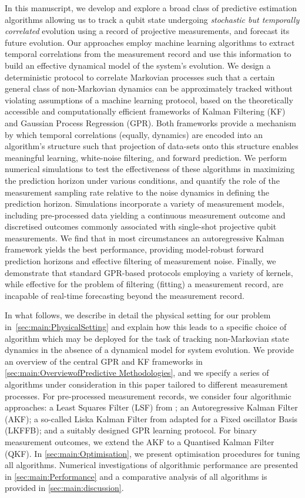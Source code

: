 In this manuscript, we develop and explore a broad class of predictive estimation algorithms allowing us to track a qubit state undergoing \emph{stochastic but temporally correlated} evolution using a record of projective measurements, and forecast its future evolution. Our approaches employ machine learning algorithms to extract temporal correlations from the measurement record and use this information to build an effective dynamical model of the system's evolution.  We design a deterministic protocol to correlate Markovian processes such that a certain general class of non-Markovian dynamics can be approximately tracked without violating assumptions of a machine learning protocol, based on the theoretically accessible and computationally efficient frameworks of Kalman Filtering (KF) and Gaussian Process Regression (GPR).  Both frameworks provide a mechanism by which temporal correlations (equally, dynamics) are encoded into an algorithm's structure such that projection of data-sets onto this structure enables meaningful learning, white-noise filtering, and forward prediction.  We perform numerical simulations to test the effectiveness of these algorithms in maximizing the prediction horizon under various conditions, and quantify the role of the measurement sampling rate relative to the noise dynamics in defining the prediction horizon.  Simulations incorporate a variety of measurement models, including pre-processed data yielding a continuous measurement outcome and discretised outcomes commonly associated with single-shot projective qubit measurements.   We find that in most circumstances an autoregressive Kalman framework yields the best performance, providing model-robust forward prediction horizons and effective filtering of measurement noise.  Finally, we demonstrate that standard GPR-based protocols employing a variety of kernels, while effective for the problem of filtering (fitting) a measurement record, are incapable of real-time forecasting beyond the measurement record.  

In what follows, we describe in detail the physical setting for our problem in~\cref{sec:main:PhysicalSetting} and explain how this leads to a specific choice of algorithm which may be deployed for the task of tracking non-Markovian state dynamics in the absence of a dynamical model for system evolution.  We provide an overview of the central GPR and KF frameworks in \cref{sec:main:OverviewofPredictive Methodologies}, and we specify a series of algorithms under consideration in this paper tailored to different measurement processes. For pre-processed measurement records, we consider four algorithmic approaches: a Least Squares Filter (LSF) from \cite{mavadia2017}; an Autoregressive Kalman Filter (AKF); a so-called Liska Kalman Filter from \cite{livska2007} adapted for a Fixed oscillator Basis (LKFFB); and a suitably designed GPR learning protocol. For binary measurement outcomes, we extend the AKF to a Quantised Kalman Filter (QKF). In \cref{sec:main:Optimisation}, we present optimisation procedures for tuning all algorithms. Numerical investigations of algorithmic performance are presented in \cref{sec:main:Performance} and a comparative analysis of all algorithms is provided in \cref{sec:main:discussion}. 

